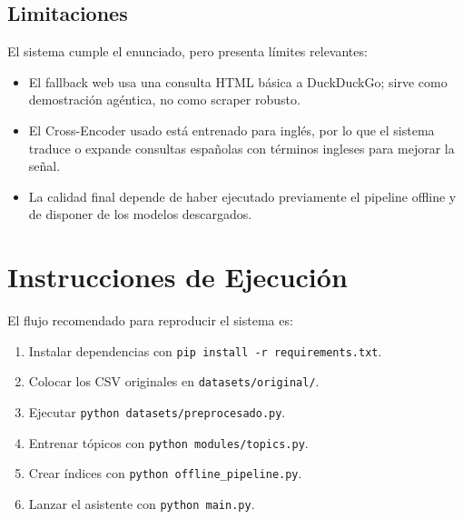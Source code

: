 \documentclass[11pt,a4paper]{article}
\begin{document}
\begin{table}[h]
\centering
\scriptsize
{}
\caption{Comparación cualitativa del modelado de tópicos.}
\label{tab:experimento}
\end{table}

\subsection{Limitaciones}

El sistema cumple el enunciado, pero presenta límites relevantes:
\begin{itemize}
    \item El fallback web usa una consulta HTML básica a DuckDuckGo; sirve como demostración agéntica, no como scraper robusto.
    \item El Cross-Encoder usado está entrenado para inglés, por lo que el sistema traduce o expande consultas españolas con términos ingleses para mejorar la señal.
    \item La calidad final depende de haber ejecutado previamente el pipeline offline y de disponer de los modelos descargados.
\end{itemize}

\section{Instrucciones de Ejecución}

El flujo recomendado para reproducir el sistema es:
\begin{enumerate}
    \item Instalar dependencias con \texttt{pip install -r requirements.txt}.
    \item Colocar los CSV originales en \texttt{datasets/original/}.
    \item Ejecutar \texttt{python datasets/preprocesado.py}.
    \item Entrenar tópicos con \texttt{python modules/topics.py}.
    \item Crear índices con \texttt{python offline\_pipeline.py}.
    \item Lanzar el asistente con \texttt{python main.py}.
\end{enumerate}
\end{document}
